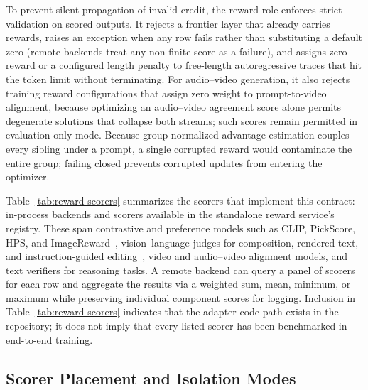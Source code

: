 To prevent silent propagation of invalid credit, the reward role enforces strict validation on scored outputs.
It rejects a frontier layer that already carries rewards, raises an exception when any row fails rather than substituting a default zero (remote backends treat any non-finite score as a failure), and assigns zero reward or a configured length penalty to free-length autoregressive traces that hit the token limit without terminating.
For audio--video generation, it also rejects training reward configurations that assign zero weight to prompt-to-video alignment, because optimizing an audio--video agreement score alone permits degenerate solutions that collapse both streams; such scores remain permitted in evaluation-only mode.
Because group-normalized advantage estimation couples every sibling under a prompt, a single corrupted reward would contaminate the entire group; failing closed prevents corrupted updates from entering the optimizer.

Table~\ref{tab:reward-scorers} summarizes the scorers that implement this contract: \RSLocalBackends{} in-process backends and \RSServiceScorers{} scorers available in the standalone reward service's registry.
These span contrastive and preference models such as CLIP, PickScore, HPS, and ImageReward~\citep{radford2021clip,kirstain2023pickapic,wu2023hpsv2,ma2025hpsv3,xu2023imagereward}, vision--language judges for composition, rendered text, and instruction-guided editing~\citep{kamath2025geneval2,wu2025editreward,luo2025editscore}, video and audio--video alignment models, and text verifiers for reasoning tasks.
A remote backend can query a panel of scorers for each row and aggregate the results via a weighted sum, mean, minimum, or maximum while preserving individual component scores for logging.
Inclusion in Table~\ref{tab:reward-scorers} indicates that the adapter code path exists in the repository; it does not imply that every listed scorer has been benchmarked in end-to-end training.

\begin{table}[H]
\caption{Reward implementations at UniRL commit \texttt{651490e}, grouped by scored output modality. Names denote registry keys. $^{\ast}$Present in the registry but disabled in the default service configuration.}
\label{tab:reward-scorers}
\centering
\small

\end{table}

\subsection{Scorer Placement and Isolation Modes}
\label{sec:reward-placement}

